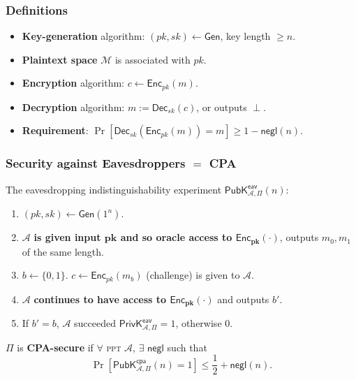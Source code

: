 \begin{frame}\frametitle{Definitions}
\begin{figure}
\begin{center}

\end{center}
\end{figure}
\begin{itemize}
\item \textbf{Key-generation} algorithm: $(pk,sk) \gets \mathsf{Gen}$, key length $\ge n$.
\item  \textbf{Plaintext space} $\mathcal{M}$ is associated with $pk$.
\item \textbf{Encryption} algorithm: $c \gets \mathsf{Enc}_{pk}(m)$.
\item \textbf{Decryption} algorithm: $m:= \mathsf{Dec}_{sk}(c)$, or outputs $\perp$.
\item \textbf{Requirement}: $\Pr[\mathsf{Dec}_{sk}(\mathsf{Enc}_{pk}(m)) = m] \ge 1 - \mathsf{negl}(n)$.
\end{itemize}
\end{frame}
\begin{frame}\frametitle{Security against Eavesdroppers $=$ CPA}
The eavesdropping indistinguishability experiment $\mathsf{PubK}^{\mathsf{eav}}_{\mathcal{A},\Pi}(n)$:
\begin{enumerate}
\item $(pk,sk) \gets \mathsf{Gen}(1^n)$.
\item $\mathcal{A}$ \textbf{is given input $\mathbf{pk}$ and so oracle access to $\mathbf{\mathsf{Enc}_{pk}(\cdot)}$}, outputs $m_0, m_1$ of the same length. 
\item $b \gets \{0,1\}$. $c \gets \mathsf{Enc}_{pk}(m_b)$ (challenge) is given to $\mathcal{A}$.
\item $\mathcal{A}$ \textbf{continues to have access to $\mathbf{\mathsf{Enc}_{pk}(\cdot)}$} and outputs $b'$.
\item If $b' = b$, $\mathcal{A}$ succeeded $\mathsf{PrivK}^{\mathsf{eav}}_{\mathcal{A},\Pi}=1$, otherwise 0.
\end{enumerate}
\begin{definition}
$\Pi$ is \textbf{CPA-secure} if $\forall$ \textsc{ppt} $\mathcal{A}$, $\exists$ $\mathsf{negl}$ such that
\[ \Pr\left[\mathsf{PubK}^{\mathsf{cpa}}_{\mathcal{A},\Pi}(n)=1\right] \le \frac{1}{2} + \mathsf{negl}(n). \]
\end{definition}
\end{frame}
